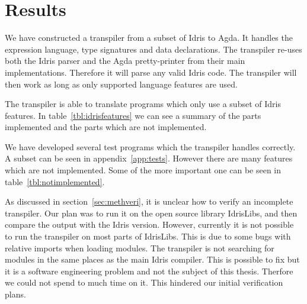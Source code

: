 \chapter{Results}



We have constructed a transpiler from a subset of Idris to Agda. It handles the
expression language, type signatures and data declarations.
The transpiler re-uses both the Idris parser and the Agda pretty-printer from
their main implementations. Therefore it will parse any valid Idris code. The
transpiler will then work as long as only supported language features are used.

The transpiler is able to translate programs which only use a subset of Idris
features. In table~\ref{tbl:idrisfeatures} we can see a summary of the parts
implemented and the parts which are not implemented.


We have developed several test programs which the transpiler handles correctly.
A subset can be seen in appendix~\ref{app:tests}. However there are many
features which are not implemented. Some of the more important one can be seen
in table~\ref{tbl:notimplemented}.

As discussed in section~\ref{sec:methveri}, it is unclear how to verify an
incomplete transpiler. Our plan was to run it on the open source library
IdrisLibs, and then compare the output with the Idris version.
However, currently it is not possible to run the transpiler on most parts of
IdrisLibs.  This is due to some bugs with relative imports when loading
modules. The transpiler is not searching for modules in the same places as the
main Idris compiler.
This is possible to fix but it is a software engineering
problem and not the subject of this thesis. Therfore we could not spend to much
time on it. This hindered our initial verification plans.



